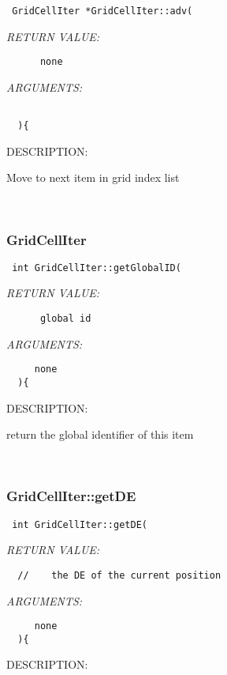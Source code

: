   
\begin{verbatim} GridCellIter *GridCellIter::adv(\end{verbatim}{\em RETURN VALUE:}
\begin{verbatim}      none\end{verbatim}{\em ARGUMENTS:}
\begin{verbatim}    
 
  ){\end{verbatim}
{\sf DESCRIPTION:\\ }


   Move to next item in grid index list
   
 
\mbox{}\hrulefill\
 
\subsubsection [GridCellIter] {GridCellIter }


  
\begin{verbatim} int GridCellIter::getGlobalID(\end{verbatim}{\em RETURN VALUE:}
\begin{verbatim}      global id\end{verbatim}{\em ARGUMENTS:}
\begin{verbatim}     none  
  ){\end{verbatim}
{\sf DESCRIPTION:\\ }


   return the global identifier of this item
   
 
\mbox{}\hrulefill\
 
\subsubsection [GridCellIter::getDE] {GridCellIter::getDE}


  
\begin{verbatim} int GridCellIter::getDE(\end{verbatim}{\em RETURN VALUE:}
\begin{verbatim}  //    the DE of the current position\end{verbatim}{\em ARGUMENTS:}
\begin{verbatim}     none  
  ){\end{verbatim}
{\sf DESCRIPTION:\\ }


